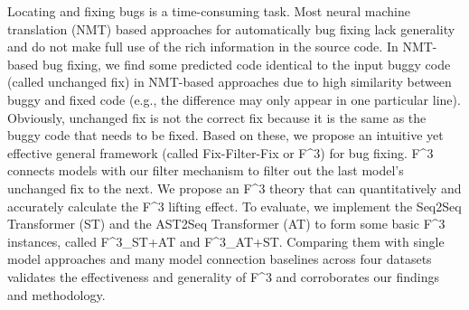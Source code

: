Locating and fixing bugs is a time-consuming task. Most neural machine translation  (NMT) based approaches for automatically bug fixing lack generality and do not make full use of the rich information in the source code. In NMT-based bug fixing, we find some predicted code identical to the input buggy code  (called unchanged fix) in NMT-based approaches due to high similarity between buggy and fixed code  (e.g., the difference may only appear in one particular line). Obviously, unchanged fix is not the correct fix because it is the same as the buggy code that needs to be fixed. Based on these, we propose an intuitive yet effective general framework (called Fix-Filter-Fix or F^3) for bug fixing. F^3 connects models with our filter mechanism to filter out the last model's unchanged fix to the next. We propose an F^3 theory that can quantitatively and accurately calculate the F^3 lifting effect. To evaluate, we implement the  Seq2Seq Transformer  (ST) and the AST2Seq Transformer  (AT) to form some basic F^3 instances, called F^3\_{ST+AT} and F^3\_{AT+ST}. Comparing them with single model approaches and many model connection baselines across four datasets validates the effectiveness and generality of F^3 and corroborates our findings and methodology.
